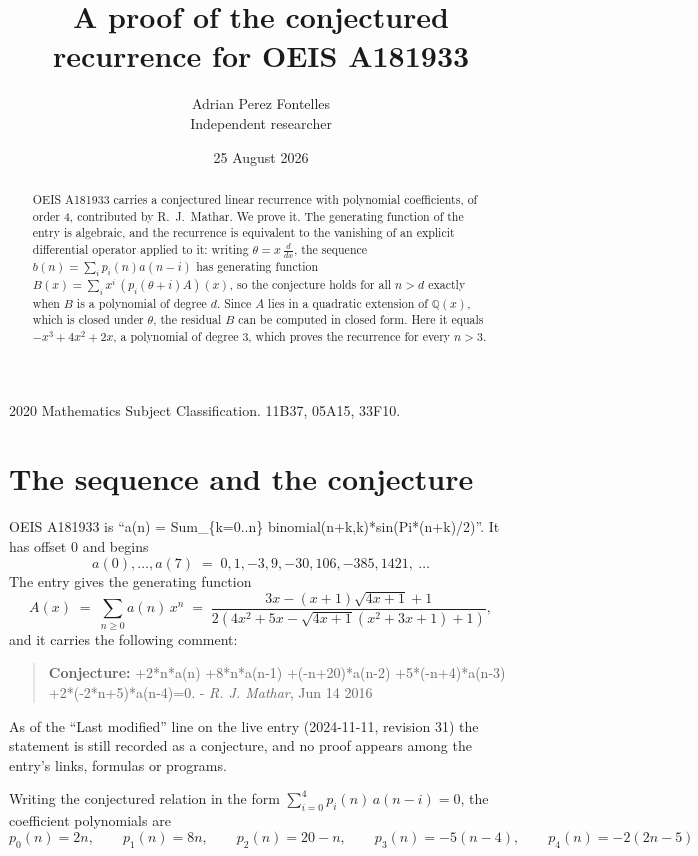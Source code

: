 \documentclass[11pt,a4paper]{article}
\title{A proof of the conjectured recurrence for OEIS A181933}
\author{Adrian Perez Fontelles\\ \small Independent researcher}
\date{25 August 2026}
\theoremstyle{plain}
\theoremstyle{definition}
\begin{document}
\maketitle

\begin{abstract}
OEIS A181933 carries a conjectured linear recurrence with polynomial coefficients, of
order 4, contributed by R.~J.~Mathar. We prove it. The generating function of the
entry is algebraic, and the recurrence is equivalent to the vanishing of an explicit
differential operator applied to it: writing $\theta=x\,\frac{d}{dx}$, the sequence
$b(n)=\sum_{i}p_{i}(n)a(n-i)$ has generating function
$B(x)=\sum_{i}x^{i}\,(p_{i}(\theta+i)A)(x)$, so the conjecture holds for all $n>d$ exactly
when $B$ is a polynomial of degree $d$. Since $A$ lies in a quadratic extension of
$\mathbb{Q}(x)$, which is closed under $\theta$, the residual $B$ can be computed in
closed form. Here it equals $- x^{3} + 4 x^{2} + 2 x$, a polynomial of degree $3$, which proves
the recurrence for every $n>3$.
\end{abstract}

\noindent\small 2020 Mathematics Subject Classification. 11B37, 05A15, 33F10.\normalsize

\section{The sequence and the conjecture}

OEIS A181933 is ``a(n) = Sum\_\{k=0..n\} binomial(n+k,k)*sin(Pi*(n+k)/2)''. It has offset $0$ and begins
\[
a(0),\dots,a(7)\;=\;0, 1, -3, 9, -30, 106, -385, 1421,\ \dots
\]
The entry gives the generating function
\begin{equation}\label{eq:gf}
A(x)\;=\;\sum_{n\ge 0} a(n)\,x^{n}\;=\;\frac{3 x - \left(x + 1\right) \sqrt{4 x + 1} + 1}{2 \left(4 x^{2} + 5 x - \sqrt{4 x + 1} \left(x^{2} + 3 x + 1\right) + 1\right)} ,
\end{equation}
and it carries the following comment:
\begin{quote}\small
\textbf{Conjecture:} +2*n*a(n) +8*n*a(n-1) +(-n+20)*a(n-2) +5*(-n+4)*a(n-3) +2*(-2*n+5)*a(n-4)=0. - \emph{R. J. Mathar}, Jun 14 2016
\end{quote}
As of the ``Last modified'' line on the live entry (2024-11-11, revision 31) the
statement is still recorded as a conjecture, and no proof appears among the entry's links,
formulas or programs.

Writing the conjectured relation in the form $\sum_{i=0}^{4}p_{i}(n)\,a(n-i)=0$,
the coefficient polynomials are
\[
p_{0}(n)=2 n,\qquad p_{1}(n)=8 n,\qquad p_{2}(n)=20 - n,\qquad p_{3}(n)=- 5 \left(n - 4\right),\qquad p_{4}(n)=- 2 \left(2 n - 5\right)
\]
\end{document}
